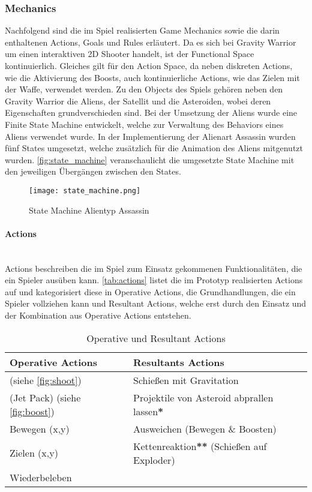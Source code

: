 \documentclass[11pt]{scrartcl}
\newcommand{\lbparagraph}[1]{\paragraph*{#1}\mbox{}\\}
\begin{document}
\subsubsection{Mechanics}
\label{subsec:mec}
Nachfolgend sind die im Spiel realisierten Game Mechanics sowie die darin enthaltenen Actions, Goals und Rules erläutert. Da es sich bei Gravity Warrior um einen interaktiven 2D Shooter handelt, ist der Functional Space\cite[~p.133]{S2014} kontinuierlich. Gleiches gilt für den Action Space, da neben diskreten Actions, wie die Aktivierung des Boosts, auch kontinuierliche Actions, wie das Zielen mit der Waffe, verwendet werden. Zu den Objects des Spiels gehören neben den Gravity Warrior die Aliens, der Satellit und die Asteroiden, wobei deren Eigenschaften grundverschieden sind. Bei der Umsetzung der Aliens wurde eine Finite State Machine entwickelt, welche zur Verwaltung des Behaviors eines Aliens verwendet wurde. In der Implementierung der Alienart Assassin wurden fünf States umgesetzt, welche zusätzlich für die Animation des Aliens mitgenutzt wurden. \autoref{fig:state_machine} veranschaulicht die umgesetzte State Machine mit den jeweiligen Übergängen zwischen den States.

\begin{figure}[htp]
	\centering
	\texttt{[image: state\_machine.png]}
	\caption{State Machine Alientyp Assassin}
	\label{fig:state_machine}
\end{figure}

\lbparagraph{Actions}
Actions beschreiben die im Spiel zum Einsatz gekommenen Funktionalitäten, die ein Spieler ausüben kann. \autoref{tab:actions} listet die im Prototyp realisierten Actions auf und kategorisiert diese in Operative Actions, die Grundhandlungen, die ein Spieler vollziehen kann und Resultant Actions, welche erst durch den Einsatz und der Kombination aus Operative Actions entstehen\cite[~p.140]{S2014}.


\begin{table}[htp]
\centering
\begin{tabular}{|l|l|}
\hline
\textbf{Operative Actions}&\textbf{Resultants Actions} \\
\hline
\nameref{fig:shoot} (siehe \autoref{fig:shoot})&Schießen mit Gravitation \\
\hline
\nameref{fig:boost} (Jet Pack) (siehe \autoref{fig:boost})&Projektile von Asteroid abprallen lassen\textbf{*}\\
\hline
Bewegen (x,y)&Ausweichen (Bewegen \& Boosten)\\
\hline
Zielen (x,y)&Kettenreaktion\textbf{**} (Schießen auf Exploder)\\
\hline
Wiederbeleben&\\
\hline
\end{tabular}
\caption{Operative und Resultant Actions}
\label{tab:actions}
\end{table}
\end{document}
